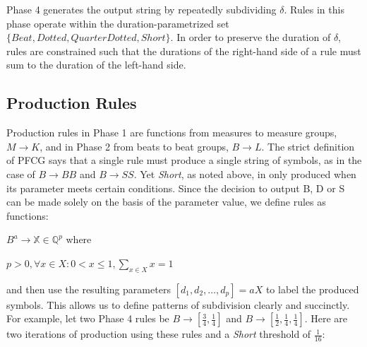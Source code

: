 \documentclass{article}
\begin{document}
Phase 4 generates the output string by repeatedly subdividing $\delta$. Rules in this phase operate within the duration-parametrized set $\{Beat,\allowbreak Dotted,\allowbreak QuarterDotted,\allowbreak Short\}$. In order to preserve the duration of $\delta$, rules are constrained such that the durations of the right-hand side of a rule must sum to the duration of the left-hand side.









\subsection{Production Rules}

Production rules in Phase 1 are functions from measures to measure groups, $M \rightarrow K$, and in Phase 2 from beats to beat groups, $B \rightarrow L$. The strict definition of PFCG says that a single rule must produce a single string of symbols, as in the case of $B \rightarrow BB$ and $B \rightarrow SS$.  Yet \emph{Short}, as noted above, in only produced when its parameter meets certain conditions. Since the decision to output B, D or S can be made solely on the basis of the parameter value, we define rules as functions:

$B^a \rightarrow \mathbb{X} \in \mathbb{Q}^{p}$ where 

$p > 0 , \forall x \in X: 0 < x \leq 1, \sum_{x \in X} x = 1$

and then use the resulting parameters $[d_1,d_2,…,d_p]=aX$ to label the produced symbols. This allows us to define patterns of subdivision clearly and succinctly. For example, let two Phase 4 rules be $B \rightarrow [\frac{3}{4}, \frac{1}{4}]$ and $B \rightarrow [\frac{1}{2}, \frac{1}{4}, \frac{1}{4}]$. Here are two iterations of production using these rules and a \emph{Short} threshold of $\frac{1}{16}$:
\end{document}
